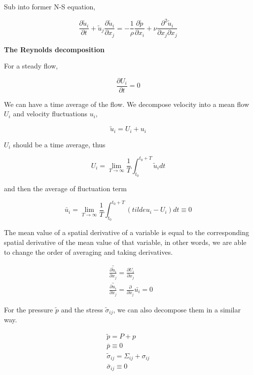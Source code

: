 \documentclass{article}
\begin{document}
Sub into former N-S equation,

\begin{equation*}
    \frac{\partial\tilde u_i}{\partial t}+\tilde u_j\frac{\partial\tilde u_i}{\partial x_j}=-\frac{1}{\rho}\frac{\partial\tilde p}{\partial x_i}+\nu\frac{\partial^2\tilde u_i}{\partial x_j\partial x_j}
\end{equation*}

\textbf{The Reynolds decomposition}

For a steady flow,

\begin{equation*}
    \frac{\partial U_i}{\partial t}=0
\end{equation*}

We can have a time average of the flow. We decompose velocity into a mean flow $U_i$ and velocity fluctuations $u_i$,

\begin{equation*}
    \tilde u_i=U_i+u_i
\end{equation*}

$U_i$ should be a time average, thus

\begin{equation*}
    U_i=\lim_{T\rightarrow\infty}\frac{1}{T}\int_{t_0}^{t_0+T}\tilde u_i dt
\end{equation*}

and then the average of fluctuation term

\begin{equation*}
    \bar u_i=\lim_{T\rightarrow\infty}\frac{1}{T}\int_{t_0}^{t_0+T}(tilde u_i -U_i)dt\equiv 0
\end{equation*}

The mean value of a spatial derivative of a variable is equal to the corresponding spatial derivative of the mean value of that variable, in other words, we are able to change the order of averaging and taking derivatives.

\begin{align*}
     & \bar{\frac{\partial \tilde u_i}{\partial x_j}}=\frac{\partial U_i}{\partial x_j} \\
     & \bar{\frac{\partial u_i}{\partial x_j}}=\frac{\partial}{\partial x_j}\bar{u_i}=0
\end{align*}

For the pressure $\tilde p$ and the stress $\tilde \sigma_{ij}$, we can also decompose them in a similar way.

\begin{gather*}
    \tilde p=P+p\\
    \bar p\equiv0\\
    \tilde\sigma_{ij}=\Sigma_{ij}+\sigma_{ij}\\
    \bar\sigma_{ij}\equiv0
\end{gather*}
\end{document}
